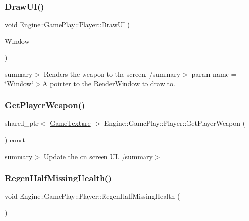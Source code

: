 \subsubsection{\texorpdfstring{Draw\+U\+I()}{DrawUI()}}
{\footnotesize\ttfamily void Engine\+::\+Game\+Play\+::\+Player\+::\+Draw\+UI (\begin{DoxyParamCaption}\item[{Render\+Window $\ast$}]{Window }\end{DoxyParamCaption})}

summary$>$ Renders the weapon to the screen. /summary$>$ param name = \char`\"{}\+Window\char`\"{}$>$A pointer to the Render\+Window to draw to.\mbox{\label{class_engine_1_1_game_play_1_1_player_a22261e9c06350f20de748418085dd26a}} 
\subsubsection{\texorpdfstring{Get\+Player\+Weapon()}{GetPlayerWeapon()}}
{\footnotesize\ttfamily shared\+\_\+ptr$<$ \hyperlink{class_engine_1_1_core_1_1_game_texture}{Game\+Texture} $>$ Engine\+::\+Game\+Play\+::\+Player\+::\+Get\+Player\+Weapon (\begin{DoxyParamCaption}\item[{void}]{ }\end{DoxyParamCaption}) const}

summary$>$ Update the on screen UI. /summary$>$ \mbox{\label{class_engine_1_1_game_play_1_1_player_aad2c7f9e75ef259e202be0d00924ec1d}} 
\subsubsection{\texorpdfstring{Regen\+Half\+Missing\+Health()}{RegenHalfMissingHealth()}}
{\footnotesize\ttfamily void Engine\+::\+Game\+Play\+::\+Player\+::\+Regen\+Half\+Missing\+Health (\begin{DoxyParamCaption}\item[{void}]{ }\end{DoxyParamCaption})}

